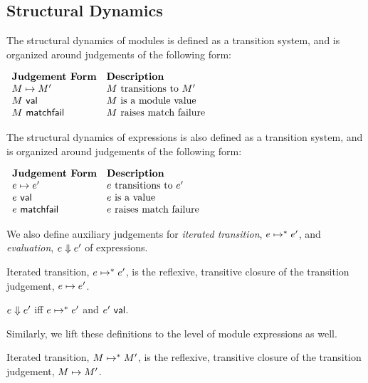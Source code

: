 \subsection{Structural Dynamics}
The structural dynamics of modules is defined as a transition system, and is organized around judgements of the following form:

\vspace{10px}
$\begin{array}{ll}
\textbf{Judgement Form} & \textbf{Description}\\
M \mapsto M' & \text{$M$ transitions to $M'$}\\
M~\mathsf{val} & \text{$M$ is a module value}\\
M~\mathsf{matchfail} & \text{$M$ raises match failure}
\end{array}$
\vspace{10px}

The structural dynamics of expressions is also defined as a transition system, and is organized around judgements of the following form:

\vspace{10px}
$\begin{array}{ll}
\textbf{Judgement Form} & \textbf{Description}\\
e \mapsto e' & \text{$e$ transitions to $e'$}\\
e~\mathsf{val} & \text{$e$ is a value}\\
e~\mathsf{matchfail} & \text{$e$ raises match failure}
\end{array}$
\vspace{10px}

We also define auxiliary judgements for \emph{iterated transition}, $e \mapsto^{*} e'$, and \emph{evaluation}, $e \Downarrow e'$ of expressions.

\begin{definition}\label{defn:iterated-transition-P} Iterated transition, $e \mapsto^{*} e'$, is the reflexive, transitive closure of the transition judgement, $e \mapsto e'$.\end{definition}

\begin{definition}[Evaluation]\label{defn:evaluation-P} $e \Downarrow e'$ iff $e \mapsto^{*} e'$ and $e'~\mathsf{val}$. \end{definition}

Similarly, we lift these definitions to the level of module expressions as well.

\begin{definition}\label{defn:iterated-transition-modules-P} Iterated transition, $M \mapsto^{*} M'$, is the reflexive, transitive closure of the transition judgement, $M \mapsto M'$.\end{definition}

